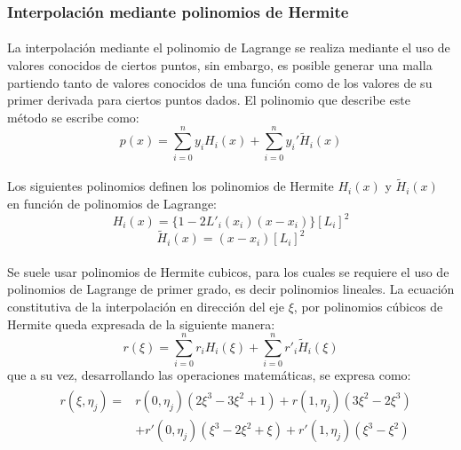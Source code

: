 \documentclass[letterpaper, openright, 12pt]{book}
\begin{document}
    \subsubsection{Interpolación mediante polinomios de Hermite}
    \paragraph*{}
    La interpolación mediante el polinomio de Lagrange se realiza mediante
    el uso de valores conocidos de ciertos puntos, sin embargo, es posible
    generar una malla partiendo tanto de valores conocidos de una función
    como de los valores de su primer derivada para ciertos puntos dados.
    El polinomio que describe este método se escribe como:
    \begin{equation}
    p(x) = \sum_{i = 0}^{n} y_{i}H_{i}(x) + \sum_{i = 0}^{n}y_{i}\prime \widetilde{H}_{i}(x)
    \end{equation}

    \paragraph*{}
    Los siguientes polinomios definen los polinomios de Hermite $H_{i}(x)$
    y $\widetilde{H}_{i}(x)$
    en función de polinomios de Lagrange:
    \begin{equation}
        H_{i}(x) = \{  1 - 2L\prime_{i}(x_{i})(x - x_{i})\}
        \left[L_{i}\right]^2
    \end{equation}
    \begin{equation}
        \widetilde{H}_{i}(x) = (x - x_{i}) \left[L_{i}\right] ^ 2
    \end{equation}

    \paragraph*{}
    Se suele usar polinomios de Hermite cubicos, para los cuales se requiere
    el uso de polinomios de Lagrange de primer grado, es decir polinomios
    lineales. La ecuación constitutiva de la interpolación en dirección del
    eje $\xi$, por polinomios cúbicos de Hermite queda expresada de la
    siguiente manera:
    \begin{equation}
        r(\xi) = \sum_{i = 0}^{n} r_{i}H_{i}(\xi) + \sum_{i = 0}^{n} r\prime_{i}\widetilde{H}_{i}(\xi)
    \end{equation}
    que a su vez, desarrollando las operaciones matemáticas, se expresa como:
    \begin{align}
        &\begin{aligned}
            r(\xi, \eta_{j}) =& r(0, \eta_{j})(2\xi^3 - 3\xi^2 +1)
                        + r(1, \eta_{j})(3\xi^2 - 2\xi^3) \\
                        &+ r\prime(0, \eta_{j})(\xi^3 - 2\xi^2 + \xi)
                        + r\prime(1, \eta_{j})(\xi^3 - \xi^2)
        \end{aligned}
    \end{align}
\end{document}
